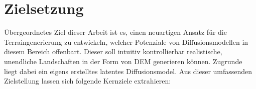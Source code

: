 \section{Zielsetzung}
\label{sec:Zielsetzung}

Übergeordnetes Ziel dieser Arbeit ist es, einen neuartigen Ansatz für die Terraingenerierung zu entwickeln, welcher Potenziale von Diffusionsmodellen in diesem Bereich offenbart. Dieser soll intuitiv kontrollierbar realistische, unendliche Landschaften in der Form von \ac{DEM} generieren können. Zugrunde liegt dabei ein eigens erstelltes latentes Diffusionsmodel. Aus dieser umfassenden Zielstellung lassen sich folgende Kernziele extrahieren:

